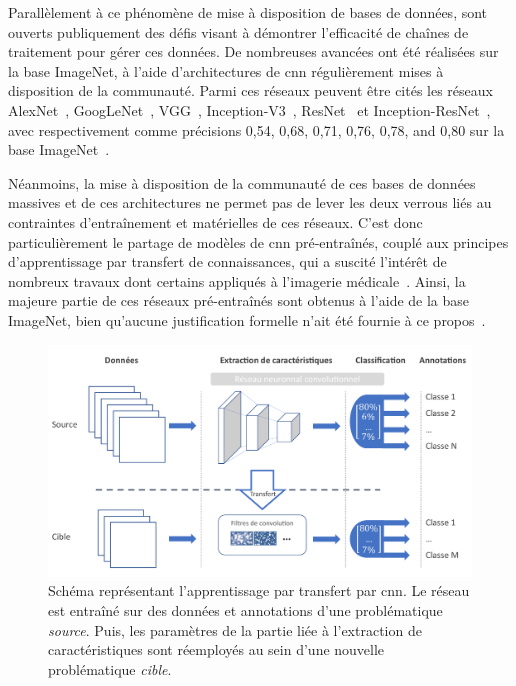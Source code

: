Parallèlement à ce phénomène de mise à disposition de bases de données, sont ouverts publiquement des défis visant à démontrer l'efficacité de chaînes de traitement pour gérer ces données. De nombreuses avancées ont été réalisées sur la base ImageNet, à l'aide d'architectures de \gls{cnn} régulièrement mises à disposition de la communauté. Parmi ces réseaux peuvent être cités les réseaux AlexNet~\cite{Krizhevsky2012}, GoogLeNet~\cite{Szegedy2015}, VGG~\cite{Simonyan2014}, Inception-V3~\cite{Szegedy2016}, ResNet~\cite{He2016} et Inception-ResNet~\cite{Szegedy2017}, avec respectivement comme précisions 0,54, 0,68, 0,71, 0,76, 0,78, and 0,80 sur la base ImageNet~\cite{Canziani2016}.\par

Néanmoins, la mise à disposition de la communauté de ces bases de données massives et de ces architectures ne permet pas de lever les deux verrous liés au contraintes d'entraînement et matérielles de ces réseaux. C'est donc particulièrement le partage de modèles de \gls{cnn} pré-entraînés, couplé aux principes d'apprentissage par transfert de connaissances, qui a suscité l'intérêt de nombreux travaux dont certains appliqués à l'imagerie médicale~\cite{Litjens2017}. Ainsi, la majeure partie de ces réseaux pré-entraînés sont obtenus à l'aide de la base ImageNet, bien qu'aucune justification formelle n'ait été fournie à ce propos~\cite{Huh2016}.\par
 
\begin{figure}[H]
    \centering
    \includegraphics[width=\linewidth]{contents/chapter_4/resources/scheme_transfer_learning.pdf}
    \caption{Schéma représentant l'apprentissage par transfert par \gls{cnn}. Le réseau est entraîné sur des données et annotations d'une problématique \textit{source}. Puis, les paramètres de la partie liée à l'extraction de caractéristiques sont réemployés au sein d'une nouvelle problématique \textit{cible}.}
    \label{fig:scheme_transfer_learning}
\end{figure}\par

